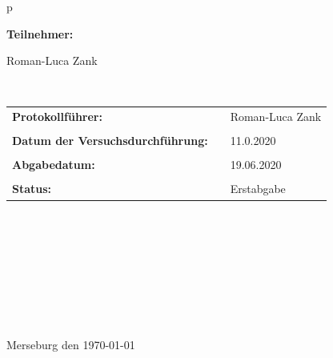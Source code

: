 \begin{center}
\begin{tabular}{p{\textwidth}}
\begin{center}
\Large{\textbf{Teilnehmer:}} \\ 
\end{center}
\begin{center}
\large{Roman-Luca Zank}
\end{center}


\\

\begin{center}
\begin{tabular}{lll}
\large{\textbf{Protokollführer:}} & &  \large{Roman-Luca Zank}\\
&&\\
\large{\textbf{Datum der Versuchsdurchführung:}}&& \large{11.0.2020}\\
&&\\
\large{\textbf{Abgabedatum:}}&& \large{19.06.2020}\\
&&\\
\large{\textbf{Status:}}&& \large{Erstabgabe}\\
\end{tabular}
\end{center}

\\ \\ \\ \\ \\ \\ \\ \\
\large{Merseburg den \today}

\end{tabular}
\end{center}
